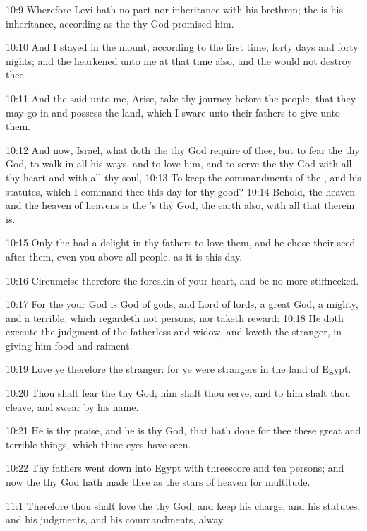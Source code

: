 10:9 Wherefore Levi hath no part nor inheritance with his brethren; the \LORD is his inheritance, according as the \LORD thy God promised him.

10:10 And I stayed in the mount, according to the first time, forty days and forty nights; and the \LORD hearkened unto me at that time also, and the \LORD would not destroy thee.

10:11 And the \LORD said unto me, Arise, take thy journey before the people, that they may go in and possess the land, which I sware unto their fathers to give unto them.

10:12 And now, Israel, what doth the \LORD thy God require of thee, but to fear the \LORD thy God, to walk in all his ways, and to love him, and to serve the \LORD thy God with all thy heart and with all thy soul, 10:13 To keep the commandments of the \LORD, and his statutes, which I command thee this day for thy good?  10:14 Behold, the heaven and the heaven of heavens is the \LORD's thy God, the earth also, with all that therein is.

10:15 Only the \LORD had a delight in thy fathers to love them, and he chose their seed after them, even you above all people, as it is this day.

10:16 Circumcise therefore the foreskin of your heart, and be no more stiffnecked.

10:17 For the \LORD your God is God of gods, and Lord of lords, a great God, a mighty, and a terrible, which regardeth not persons, nor taketh reward: 10:18 He doth execute the judgment of the fatherless and widow, and loveth the stranger, in giving him food and raiment.

10:19 Love ye therefore the stranger: for ye were strangers in the land of Egypt.

10:20 Thou shalt fear the \LORD thy God; him shalt thou serve, and to him shalt thou cleave, and swear by his name.

10:21 He is thy praise, and he is thy God, that hath done for thee these great and terrible things, which thine eyes have seen.

10:22 Thy fathers went down into Egypt with threescore and ten persons; and now the \LORD thy God hath made thee as the stars of heaven for multitude.

11:1 Therefore thou shalt love the \LORD thy God, and keep his charge, and his statutes, and his judgments, and his commandments, alway.

